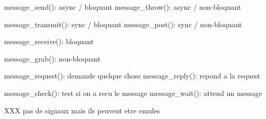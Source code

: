 message_send(): async / bloquant
message_throw(): async / non-bloquant

message_transmit(): sync / bloquant
message_post(): sync / non-bloquant

message_receive(): bloquant

message_grab(): non-bloquant

message_request(): demande quelque chose
message_reply(): repond a la request

message_check(): test si on a recu le message
message_wait(): attend un message

XXX pas de signaux mais ils peuvent etre emules
